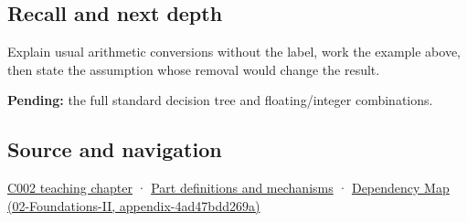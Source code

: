 \subsection{Recall and next depth}\label{appendix-5e2d663adf7f-recall-and-next-depth}

Explain usual arithmetic conversions without the label, work the example above, then state the assumption whose removal would change the result.

\textbf{Pending:} the full standard decision tree and floating/integer combinations.

\subsection{Source and navigation}\label{appendix-5e2d663adf7f-source-and-navigation}

\hyperref[01-foundations-i-ch001-arithmetic-becomes-a-policy]{C002 teaching chapter} · \hyperref[appendix-fd090d982a15]{Part definitions and mechanisms} · \href{../02-Foundations-II/main.pdf\#nameddest=appendix-4ad47bdd269a}{Dependency Map (02-Foundations-II, appendix-4ad47bdd269a)}
